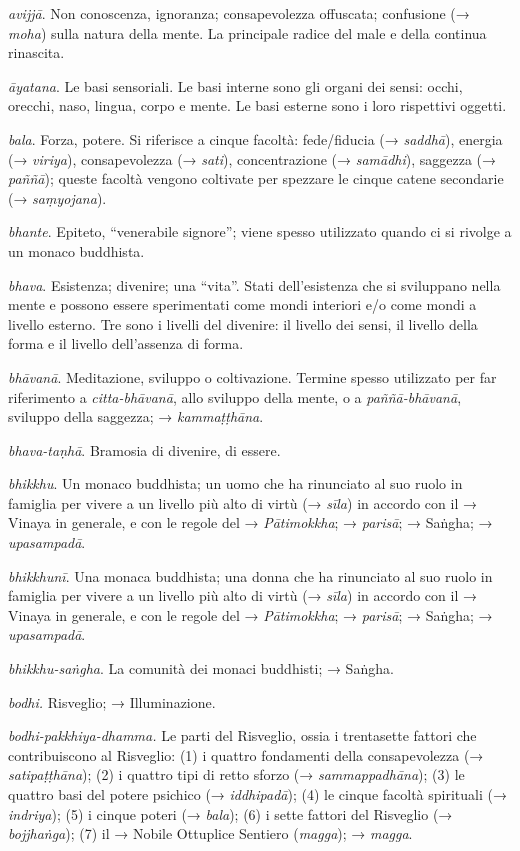 \emph{avijjā}. Non conoscenza, ignoranza; consapevolezza offuscata;
confusione (→ \emph{moha}) sulla natura della mente. La principale
radice del male e della continua rinascita.

\emph{āyatana}. Le basi sensoriali. Le basi interne sono gli organi dei
sensi: occhi, orecchi, naso, lingua, corpo e mente. Le basi esterne sono
i loro rispettivi oggetti.

\emph{bala}. Forza, potere. Si riferisce a cinque facoltà: fede/fiducia
(→ \emph{saddhā}), energia (→ \emph{viriya}), consapevolezza (→
\emph{sati}), concentrazione (→ \emph{samādhi}), saggezza (→
\emph{paññā}); queste facoltà vengono coltivate per spezzare le cinque
catene secondarie (→ \emph{saṃyojana}).

\emph{bhante}. Epiteto, ``venerabile signore''; viene spesso utilizzato
quando ci si rivolge a un monaco buddhista.

\emph{bhava}. Esistenza; divenire; una ``vita''. Stati dell'esistenza
che si sviluppano nella mente e possono essere sperimentati come mondi
interiori e/o come mondi a livello esterno. Tre sono i livelli del
divenire: il livello dei sensi, il livello della forma e il livello
dell'assenza di forma.

\emph{bhāvanā}. Meditazione, sviluppo o coltivazione. Termine spesso
utilizzato per far riferimento a \emph{citta-bhāvanā}, allo sviluppo
della mente, o a \emph{paññā-bhāvanā}, sviluppo della saggezza; →
\emph{kammaṭṭhāna}.

\emph{bhava-taṇhā}. Bramosia di divenire, di essere.

\emph{bhikkhu}. Un monaco buddhista; un uomo che ha rinunciato al suo
ruolo in famiglia per vivere a un livello più alto di virtù (→
\emph{sīla}) in accordo con il → Vinaya in generale, e con le regole del
→ \emph{Pātimokkha}; → \emph{parisā}; → Saṅgha; → \emph{upasampadā}.

\emph{bhikkhunī}. Una monaca buddhista; una donna che ha rinunciato al
suo ruolo in famiglia per vivere a un livello più alto di virtù (→
\emph{sīla}) in accordo con il → Vinaya in generale, e con le regole del
→ \emph{Pātimokkha}; → \emph{parisā}; → Saṅgha; → \emph{upasampadā}.

\emph{bhikkhu-saṅgha}. La comunità dei monaci buddhisti; → Saṅgha.

\emph{bodhi.} Risveglio; → Illuminazione.

\emph{bodhi-pakkhiya-dhamma.} Le parti del Risveglio, ossia i
trentasette fattori che contribuiscono al Risveglio: (1) i quattro
fondamenti della consapevolezza (→ \emph{satipaṭṭhāna}); (2) i quattro
tipi di retto sforzo (→ \emph{sammappadhāna}); (3) le quattro basi del
potere psichico (→ \emph{iddhipadā}); (4) le cinque facoltà spirituali
(→ \emph{indriya}); (5) i cinque poteri (→ \emph{bala}); (6) i sette
fattori del Risveglio (→ \emph{bojjhaṅga}); (7) il → Nobile Ottuplice
Sentiero (\emph{magga}); → \emph{magga}.

